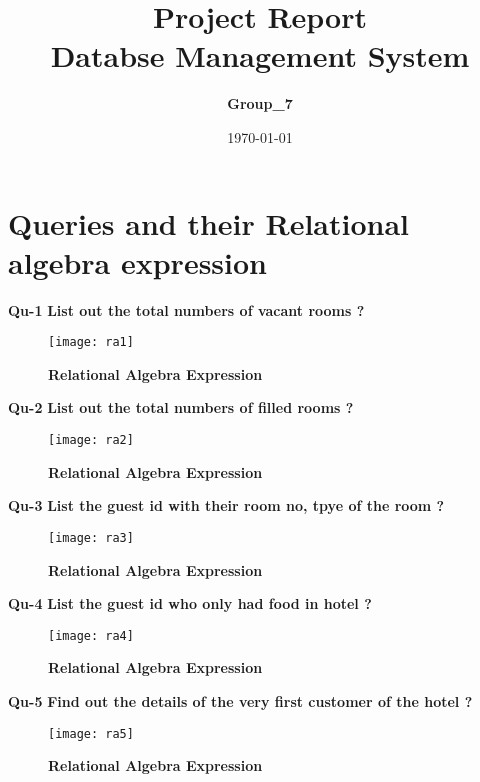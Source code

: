 \documentclass[a4,12pt]{report}
\title{ Project Report \\
						\textbf{Databse Management System}}
\author{\textbf{ Group\_7 }}
\date{\today}
\begin{document}
\maketitle

\section*{ Queries and their Relational algebra expression}

\textbf{Qu-1} \textbf{  List out the total numbers of vacant rooms ?}\\

\begin{figure}[hbtp]
\centering
\texttt{[image: ra1]}
\caption{\textbf{{\color{red}Relational Algebra Expression}}}
\end{figure}


\textbf{Qu-2} \textbf{ List out the total numbers of filled rooms ? }\\

\begin{figure}[hbtp]
\centering
\texttt{[image: ra2]}
\caption{\textbf{{\color{red}Relational Algebra Expression}}}
\end{figure}

\textbf{Qu-3} \textbf{ List the guest id with their room no, tpye of the room ? }\\

\begin{figure}[hbtp]
\centering
\texttt{[image: ra3]}
\caption{\textbf{{\color{red}Relational Algebra Expression}}}
\end{figure}

\newpage
\textbf{Qu-4} \textbf{ List the guest id who only had food in hotel ? }\\

\begin{figure}[hbtp]
\centering
\texttt{[image: ra4]}
\caption{\textbf{{\color{red}Relational Algebra Expression}}}
\end{figure}

\textbf{Qu-5} \textbf{ Find out the details of the very first customer of the hotel ?}\\

\begin{figure}[hbtp]
\centering
\texttt{[image: ra5]}
\caption{\textbf{{\color{red}Relational Algebra Expression}}}
\end{figure}
\end{document}
